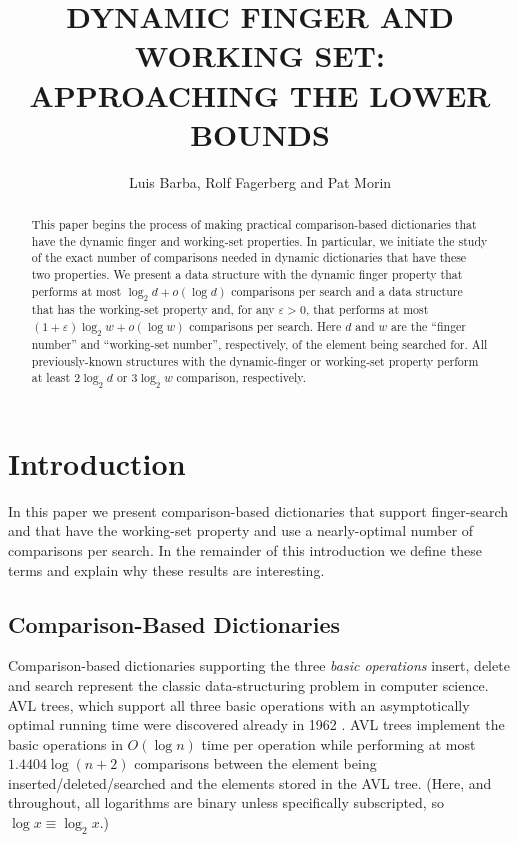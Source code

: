 \documentclass{patmorin}
\title{\MakeUppercase{Dynamic Finger and Working Set: Approaching the Lower Bounds}}
\author{Luis Barba, Rolf Fagerberg and Pat Morin}
\newcommand{\eps}{\varepsilon}
\begin{document}
\begin{titlepage}
\maketitle

\begin{abstract}
  This paper begins the process of making practical comparison-based
  dictionaries that have the dynamic finger and working-set properties.
  In particular, we initiate the study of the exact number of comparisons
  needed in dynamic dictionaries that have these two properties.  We
  present a data structure with the dynamic finger property that performs
  at most $\log_2 d+o(\log d)$ comparisons per search and a data structure
  that has the working-set property and, for any $\eps > 0$, that
  performs at most $(1+\eps)\log_2 w+o(\log w)$ comparisons per search.
  Here $d$ and $w$ are the ``finger number'' and ``working-set number'',
  respectively, of the element being searched for.  All previously-known
  structures with the dynamic-finger or working-set property
  perform at least $2\log_2 d$ or $3\log_2 w$ comparison, respectively.
\end{abstract}

\end{titlepage}

\section{Introduction}

In this paper we present comparison-based dictionaries that support
finger-search and that have the working-set property and use a
nearly-optimal number of comparisons per search.  In the remainder of
this introduction we define these terms and explain why these results
are interesting.

\subsection{Comparison-Based Dictionaries}

Comparison-based dictionaries supporting the three \emph{basic operations}
insert, delete and search represent the
classic data-structuring problem in computer science.  AVL trees, which
support all three basic operations with an asymptotically optimal running
time were discovered already in 1962 \cite{adelsson.vleski.ea:blah}.
AVL trees implement the basic operations in $O(\log n)$ time per operation
while performing at most $1.4404\log(n+2)$ comparisons between the element
being inserted/deleted/searched and the elements stored in the AVL tree.
(Here, and throughout, all logarithms are binary unless specifically
subscripted, so $\log x \equiv \log_2 x$.)
\end{document}

